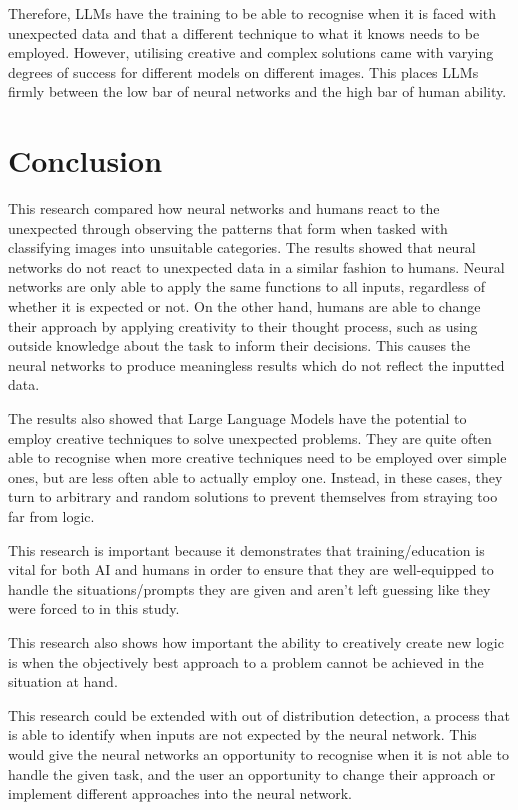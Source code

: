 \documentclass{article}
\begin{document}
\vspace{3mm}
\noindent Therefore, LLMs have the training to be able to recognise when it is faced with unexpected data and that a different technique to what it knows needs to be employed. However, utilising creative and complex solutions came with varying degrees of success for different models on different images. This places LLMs firmly between the low bar of neural networks and the high bar of human ability.


\section{Conclusion}
This research compared how neural networks and humans react to the unexpected through observing the patterns that form when tasked with classifying images into unsuitable categories. The results showed that neural networks do not react to unexpected data in a similar fashion to humans. Neural networks are only able to apply the same functions to all inputs, regardless of whether it is expected or not. On the other hand, humans are able to change their approach by applying creativity to their thought process, such as using outside knowledge about the task to inform their decisions. This causes the neural networks to produce meaningless results which do not reflect the inputted data.

The results also showed that Large Language Models have the potential to employ creative techniques to solve unexpected problems. They are quite often able to recognise when more creative techniques need to be employed over simple ones, but are less often able to actually employ one. Instead, in these cases, they turn to arbitrary and random solutions to prevent themselves from straying too far from logic.

\vspace{3mm}
\noindent This research is important because it demonstrates that training/education is vital for both AI and humans in order to ensure that they are well-equipped to handle the situations/prompts they are given and aren't left guessing like they were forced to in this study. 

This research also shows how important the ability to creatively create new logic is when the objectively best approach to a problem cannot be achieved in the situation at hand.

\vspace{3mm}
\noindent This research could be extended with out of distribution detection, a process that is able to identify when inputs are not expected by the neural network. This would give the neural networks an opportunity to recognise when it is not able to handle the given task, and the user an opportunity to change their approach or implement different approaches into the neural network.
\end{document}
